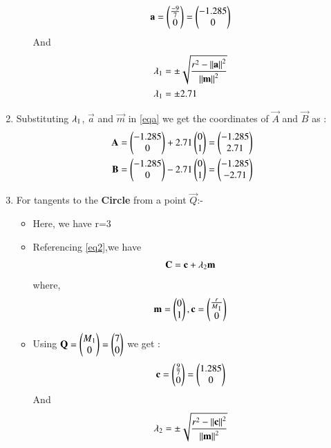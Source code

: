 \documentclass[journal,12pt,twocolumn]{IEEEtran}
\begin{document}
\begin{enumerate}
\begin{itemize}
 \begin{align}
 \vec{a}=\myvec{\frac{-9}{7}\\0} =\myvec{-1.285\\0}
\end{align}
And
\begin{align}
\lambda\textsubscript{1} &= \pm\sqrt{\frac{r^2-\norm{\vec{a}}^2}{\norm{\vec{m}}^2}}
\\
\lambda\textsubscript{1} &= \pm 2.71
\end{align}
\end{itemize}
\item Substituting $\lambda\textsubscript{1}$, $\vec{a}$ and $\vec{m}$ in \eqref{eqa} we get the coordinates of $\vec{A}$ and  $\vec{B}$ as :
\begin{align}
\vec{A}&=\myvec{-1.285\\0}+ 2.71\myvec{0\\1}=\myvec{-1.285\\2.71}
\\
\vec{B}&=\myvec{-1.285\\0}- 2.71\myvec{0\\1}=\myvec{-1.285\\-2.71}
\end{align}
\item For tangents to the \textbf{Circle} from a point $\vec{Q}$:-
\begin{itemize}
\item Here, we have r=3
\item Referencing \eqref{eq2},we have
\begin{align}
 \vec{C}=\vec{c}+\lambda\textsubscript{2} \vec{m}   \label{eqb}
\end{align}
where,
\begin{align}
 \vec{m}=\myvec{0\\1},\vec{c}=\myvec{\frac{r}{M\textsubscript{1}}\\0}
 \end{align}
 \item Using $\vec{Q}=\myvec{M\textsubscript{1}\\0}=\myvec{7\\0}$ we get :
 \begin{align}
 \vec{c}=\myvec{\frac{9}{7}\\0}=\myvec{1.285\\0}
\end{align}
And
\begin{align}
\lambda\textsubscript{2} &= \pm\sqrt{\frac {r^2-\norm{\vec{c}}^2}{\norm{\vec{m}}^2}}
\\

\end{align}
\end{itemize}
\end{enumerate}
\end{document}
